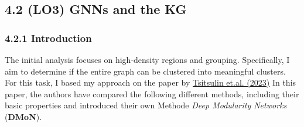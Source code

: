 \documentclass[
]{article}
\begin{document}
\subsection{4.2 (LO3) GNNs and the KG}\label{gnns-and-the-kg}

\subsubsection{4.2.1 Introduction}\label{introduction-2}

The initial analysis focuses on high-density regions and grouping.
Specifically, I aim to determine if the entire graph can be clustered
into meaningful clusters. For this task, I based my approach on the
paper by
\href{https://www.jmlr.org/papers/volume24/20-998/20-998.pdf}{Tsitsulin
et.al. (2023)} In this paper, the authors have compared the following
different methods, including their basic properties and introduced their
own Methode \emph{Deep Modularity Networks} (\textbf{DMoN}).
\end{document}
